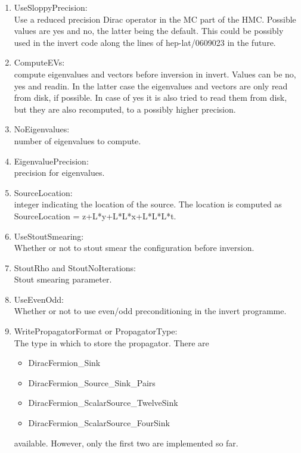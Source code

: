 \begin{enumerate}
\item {\ttfamily UseSloppyPrecision}:\\
  Use a reduced precision Dirac operator in the MC part of the
  HMC. Possible values are yes and no, the latter being the
  default. This could be possibly used in the invert code along the 
  lines of {\ttfamily hep-lat/0609023} in the future.

\item {\ttfamily ComputeEVs}:\\
  compute eigenvalues and vectors before inversion in invert. Values
  can be no, yes and readin. In the latter case the eigenvalues and
  vectors are only read from disk, if possible. In case of yes it is
  also tried to read them from disk, but they are also recomputed, to
  a possibly higher precision.

\item {\ttfamily NoEigenvalues}:\\
  number of eigenvalues to compute.

\item {\ttfamily EigenvaluePrecision}:\\
  precision for eigenvalues.

\item {\ttfamily SourceLocation}:\\
  integer indicating the location of the source. The location is computed as
  {\ttfamily SourceLocation = z+L*y+L*L*x+L*L*L*t}.

\item {\ttfamily UseStoutSmearing}:\\
  Whether or not to stout smear the configuration before inversion.

\item {\ttfamily StoutRho} and {\ttfamily StoutNoIterations}:\\
  Stout smearing parameter.

\item {\ttfamily UseEvenOdd}:\\
  Whether or not to use even/odd preconditioning in the invert
  programme.

\item {\ttfamily WritePropagatorFormat} or {\ttfamily PropagatorType}:\\
  The type in which to store the propagator. There are 
  \begin{itemize}
  \item {\ttfamily DiracFermion\_Sink}
  \item {\ttfamily DiracFermion\_Source\_Sink\_Pairs}
  \item {\ttfamily DiracFermion\_ScalarSource\_TwelveSink}
  \item {\ttfamily DiracFermion\_ScalarSource\_FourSink}
  \end{itemize}
  available. However, only the first two are implemented so far.


\end{enumerate}
